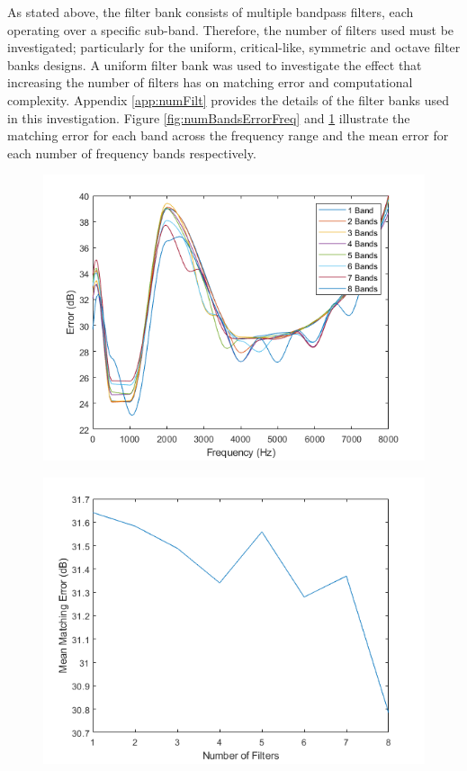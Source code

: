 \documentclass[11pt,onecolumn]{witseiepaper}
\begin{document}
\noindent As stated above, the filter bank consists of multiple bandpass filters, each operating over a specific sub-band. Therefore, the number of filters used must be investigated; particularly for the uniform, critical-like, symmetric and octave filter banks designs. A uniform filter bank was used to investigate the effect that increasing the number of filters has on matching error and computational complexity. Appendix \ref{app:numFilt} provides the details of the filter banks used in this investigation. Figure \ref{fig:numBandsErrorFreq} and \ref{fig:numBandsErrorBand} illustrate the matching error for each band across the frequency range and the mean error for each number of frequency bands respectively.

\begin{figure}
\centering
\begin{minipage}{.45\linewidth}
  \centering
  \includegraphics[width=0.9\linewidth]{numBandsErrorFreq.png}
  \label{fig:numBandsErrorFreq}
\end{minipage}%
\begin{minipage}{.45\linewidth}
  \centering
  \includegraphics[width=0.9\linewidth]{numBandErrorBand.png}
  \label{fig:numBandsErrorBand}
\end{minipage}
\end{figure}
\end{document}
